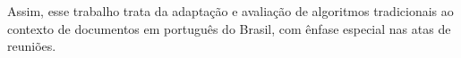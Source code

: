 Assim, esse trabalho trata da adaptação e avaliação de algoritmos tradicionais ao contexto de documentos em português do Brasil, com ênfase especial nas atas de reuniões.































